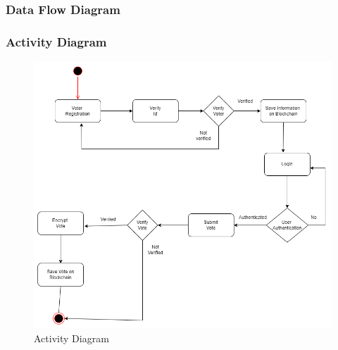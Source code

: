 \documentclass[oneside, 12pt]{book}
\begin{document}
			\subsubsection{Data Flow Diagram}
			\subsubsection{Activity Diagram}
				\begin{figure}[H]
					\centering
					\includegraphics[width=\linewidth]{./Resources/activity.png}
				    \caption{Activity Diagram}
				    \label{fig:activity}
				\end{figure}
\end{document}
